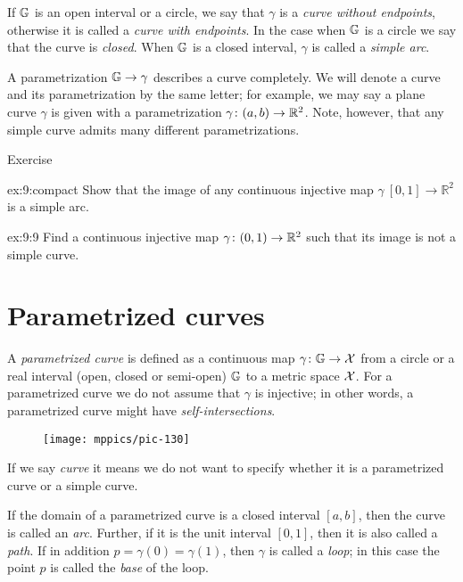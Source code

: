 If $\mathbb{G}$ is an open interval or a circle, we say that $\gamma$ is a \emph{curve without endpoints}, otherwise it is 
called a {}\emph{curve with endpoints}.
In the case when $\mathbb{G}$ is a circle we say that the curve is \emph{closed}. 
When $\mathbb{G}$ is a closed interval, $\gamma$ is called a \emph{simple arc}.


A parametrization $\mathbb{G}\to\gamma$ describes a curve completely.
We will denote a curve and its parametrization by the same letter;
for example, we may say a plane curve $\gamma$ is given with a parametrization $\gamma\:(a,b)\z\to \RR^2$.
Note, however, that any simple curve admits many different parametrizations. 

\begin{thm}{Exercise}\label{ex:9}

\begin{subthm}{ex:9:compact}
Show that the image of any continuous injective map $\gamma\:[0,1]\to\mathbb{R}^2$ is a simple arc.
\end{subthm}

\begin{subthm}{ex:9:9}
Find a continuous injective map $\gamma\colon(0,1)\to\mathbb{R}^2$ such that its image is not a simple curve.
\end{subthm}

\end{thm}


\section{Parametrized curves}

A \emph{parametrized curve} is defined as a continuous map $\gamma\colon\mathbb{G}\to\mathcal{X}$ from a circle or a real interval (open, closed or semi-open) $\mathbb{G}$ to a metric space $\mathcal{X}$. 
For a parametrized curve we do not assume that $\gamma$ is injective; in other words, a parametrized curve might have \emph{self-intersections}.

\begin{wrapfigure}{o}{15 mm}
\vskip-3mm
\centering
\texttt{[image: mppics/pic-130]}
\end{wrapfigure}

If we say \emph{curve} it means we do not want to specify whether it is a parametrized curve or a simple curve.

If the domain of a parametrized curve is a closed interval $[a,b]$, then the curve is called an \emph{arc}.
Further, if it is the unit interval $[0,1]$, then it is also called a \emph{path}.
If in addition $p=\gamma(0)=\gamma(1)$, then $\gamma$ is called a \emph{loop};
in this case the point $p$ is called the \emph{base} of the loop.

